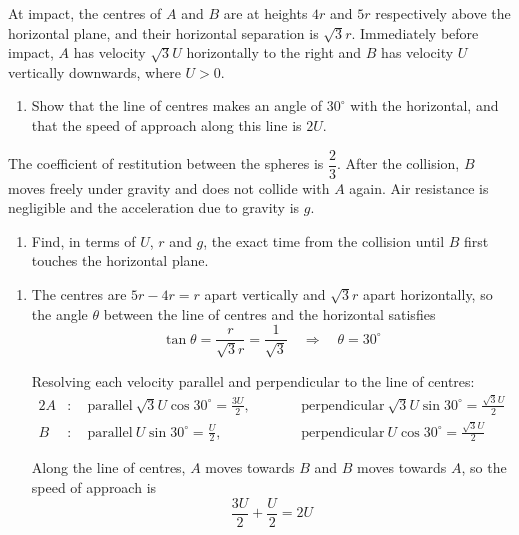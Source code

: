 \documentclass[leqno]{article}
\begin{document}
\begin{enumerate}[
  label=\textbf{\arabic*.},
  leftmargin=*,
  topsep=0pt,
  partopsep=0pt,
  parsep=0pt
]
At impact, the centres of $A$ and $B$ are at heights $4r$ and $5r$ respectively above the horizontal plane, and their horizontal separation is $\sqrt{3}r$. Immediately before impact, $A$ has velocity $\sqrt{3}U$ horizontally to the right and $B$ has velocity $U$ vertically downwards, where $U>0$. \\
\begin{enumerate}[label=\textbf{(\alph*)}]
\item Show that the line of centres makes an angle of $30^\circ$ with the horizontal, and that the speed of approach along this line is $2U$.  \\
\end{enumerate}
The coefficient of restitution between the spheres is $\dfrac{2}{3}$. After the collision, $B$ moves freely under gravity and does not collide with $A$ again. Air resistance is negligible and the acceleration due to gravity is $g$. \\
\begin{enumerate}[label=\textbf{(\alph*)}, resume]
\item Find, in terms of $U$, $r$ and $g$, the exact time from the collision until $B$ first touches the horizontal plane.  \\
\end{enumerate}

\vspace*{10pt}

\begin{djsSolution}
\begin{enumerate}[label=\textbf{(\alph*)}, start=1]
\item
The centres are \(5r-4r=r\) apart vertically and \(\sqrt3r\) apart horizontally, so the angle \(\theta\) between the line of centres and the horizontal satisfies
\[
\tan\theta=\frac{r}{\sqrt3r}=\frac{1}{\sqrt3}\quad\Longrightarrow\quad\theta=30^\circ
\]

Resolving each velocity parallel and perpendicular to the line of centres:
\begin{alignat*}{2}
A&:\quad\text{parallel}\ \sqrt3U\cos30^\circ=\frac{3U}{2},&\qquad&\text{perpendicular}\ \sqrt3U\sin30^\circ=\frac{\sqrt3U}{2}\\
B&:\quad\text{parallel}\ U\sin30^\circ=\frac{U}{2},&&\text{perpendicular}\ U\cos30^\circ=\frac{\sqrt3U}{2}
\end{alignat*}

Along the line of centres, \(A\) moves towards \(B\) and \(B\) moves towards \(A\), so the speed of approach is
\[
\frac{3U}{2}+\frac{U}{2}=2U
\]


\end{enumerate}
\end{djsSolution}
\end{enumerate}
\end{document}

